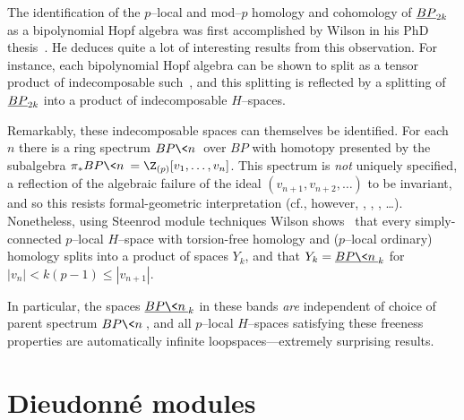 \begin{remark}\label{WilsonSpaces}
The identification of the \(p\)--local and mod--\(p\) homology and cohomology of \(\OS{BP}{2k}\) as a bipolynomial Hopf algebra was first accomplished by Wilson in his PhD thesis~\cite[Theorem 3.3]{WilsonThesisI}.  He deduces quite a lot of interesting results from this observation.  For instance, each bipolynomial Hopf algebra can be shown to split as a tensor product of indecomposable such~\cite[Proposition 3.5]{WilsonThesisI}, and this splitting is reflected by a splitting of \(\OS{BP}{2k}\) into a product of indecomposable \(H\)--spaces.

Remarkably, these indecomposable spaces can themselves be identified.  For each \(n\) there is a ring spectrum \(BP\<n\>\) over \(BP\) with homotopy presented by the subalgebra \(\pi_* BP\<n\> = \Z_{(p)}[v_1, \ldots, v_n]\).  This spectrum is \emph{not} uniquely specified, a reflection of the algebraic failure of the ideal \((v_{n+1}, v_{n+2}, \ldots)\) to be invariant, and so this resists formal-geometric interpretation (cf., however, \cite{AngeltveitLind}, \cite{LawsonNaumann}, \cite{StricklandProductsOnModules}, \ldots).  Nonetheless, using Steenrod module techniques Wilson shows~\cite[Section 6]{WilsonThesisII} that every simply-connected \(p\)--local \(H\)--space with torsion-free homology and (\(p\)--local ordinary) homology splits into a product of spaces \(Y_k\), and that \(Y_k = \OS{BP\<n\>}{k}\) for \(|v_n| < k(p-1) \le |v_{n+1}|\).

In particular, the spaces \(\OS{BP\<n\>}{k}\) in these bands \emph{are} independent of choice of parent spectrum \(BP\<n\>\), and all \(p\)--local \(H\)--spaces satisfying these freeness properties are automatically infinite loopspaces---extremely surprising results.
\end{remark}










\vspace{-1.5\baselineskip}\section{Dieudonn\'e modules}\label{SectionDieudonneModules}

